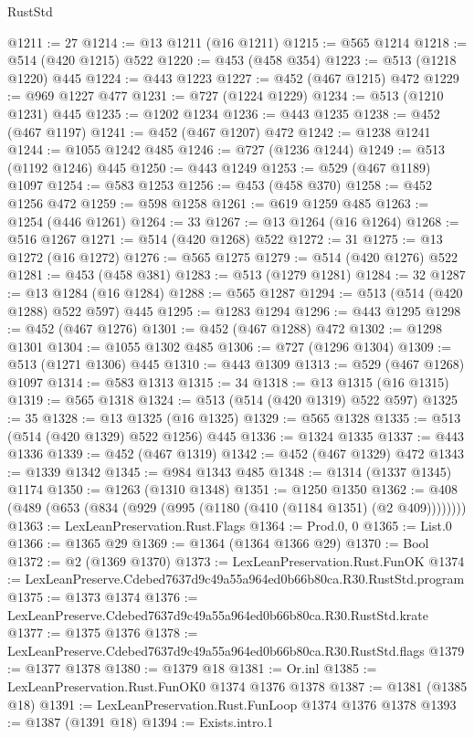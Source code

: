 \begin{lexlean}{RustStd}
\begin{coremodule}
@1211 := 27
@1214 := @13 @1211 (@16 @1211)
@1215 := @565 @1214
@1218 := @514 (@420 @1215) @522
@1220 := @453 (@458 @354)
@1223 := @513 (@1218 @1220) @445
@1224 := @443 @1223
@1227 := @452 (@467 @1215) @472
@1229 := @969 @1227 @477
@1231 := @727 (@1224 @1229)
@1234 := @513 (@1210 @1231) @445
@1235 := @1202 @1234
@1236 := @443 @1235
@1238 := @452 (@467 @1197)
@1241 := @452 (@467 @1207) @472
@1242 := @1238 @1241
@1244 := @1055 @1242 @485
@1246 := @727 (@1236 @1244)
@1249 := @513 (@1192 @1246) @445
@1250 := @443 @1249
@1253 := @529 (@467 @1189) @1097
@1254 := @583 @1253
@1256 := @453 (@458 @370)
@1258 := @452 @1256 @472
@1259 := @598 @1258
@1261 := @619 @1259 @485
@1263 := @1254 (@446 @1261)
@1264 := 33
@1267 := @13 @1264 (@16 @1264)
@1268 := @516 @1267
@1271 := @514 (@420 @1268) @522
@1272 := 31
@1275 := @13 @1272 (@16 @1272)
@1276 := @565 @1275
@1279 := @514 (@420 @1276) @522
@1281 := @453 (@458 @381)
@1283 := @513 (@1279 @1281)
@1284 := 32
@1287 := @13 @1284 (@16 @1284)
@1288 := @565 @1287
@1294 := @513 (@514 (@420 @1288) @522 @597) @445
@1295 := @1283 @1294
@1296 := @443 @1295
@1298 := @452 (@467 @1276)
@1301 := @452 (@467 @1288) @472
@1302 := @1298 @1301
@1304 := @1055 @1302 @485
@1306 := @727 (@1296 @1304)
@1309 := @513 (@1271 @1306) @445
@1310 := @443 @1309
@1313 := @529 (@467 @1268) @1097
@1314 := @583 @1313
@1315 := 34
@1318 := @13 @1315 (@16 @1315)
@1319 := @565 @1318
@1324 := @513 (@514 (@420 @1319) @522 @597)
@1325 := 35
@1328 := @13 @1325 (@16 @1325)
@1329 := @565 @1328
@1335 := @513 (@514 (@420 @1329) @522 @1256) @445
@1336 := @1324 @1335
@1337 := @443 @1336
@1339 := @452 (@467 @1319)
@1342 := @452 (@467 @1329) @472
@1343 := @1339 @1342
@1345 := @984 @1343 @485
@1348 := @1314 (@1337 @1345) @1174
@1350 := @1263 (@1310 @1348)
@1351 := @1250 @1350
@1362 := @408 (@489 (@653 (@834 (@929 (@995 (@1180 (@410 (@1184 @1351) (@2 @409))))))))
@1363 := LexLeanPreservation.Rust.Flags
@1364 := Prod.{0, 0}
@1365 := List.{0}
@1366 := @1365 @29
@1369 := @1364 (@1364 @1366 @29)
@1370 := Bool
@1372 := @2 (@1369 @1370)
@1373 := LexLeanPreservation.Rust.FunOK
@1374 := LexLeanPreserve.Cdebed7637d9c49a55a964ed0b66b80ca.R30.RustStd.program
@1375 := @1373 @1374
@1376 := LexLeanPreserve.Cdebed7637d9c49a55a964ed0b66b80ca.R30.RustStd.krate
@1377 := @1375 @1376
@1378 := LexLeanPreserve.Cdebed7637d9c49a55a964ed0b66b80ca.R30.RustStd.flags
@1379 := @1377 @1378
@1380 := @1379 @18
@1381 := Or.inl
@1385 := LexLeanPreservation.Rust.FunOK0 @1374 @1376 @1378
@1387 := @1381 (@1385 @18)
@1391 := LexLeanPreservation.Rust.FunLoop @1374 @1376 @1378
@1393 := @1387 (@1391 @18)
@1394 := Exists.intro.{1}

\end{coremodule}
\end{lexlean}
